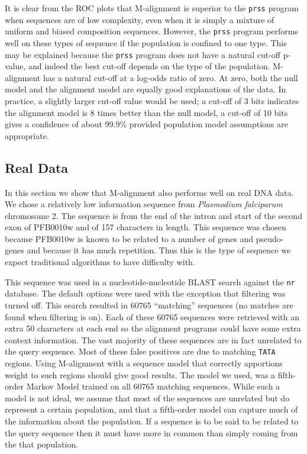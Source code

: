 \documentclass[letterpaper,11pt,oneside]{article}
\begin{document}
\begin{multicols}{2}
It is clear from the ROC plots that M-alignment is superior to
the \verb!prss! program when sequences are of low complexity, even when it is
simply a mixture of uniform and biased composition sequences.  However, the
\verb!prss! program performs well on these types of sequence if the population
is confined to one type.  This may be explained because the \verb!prss!
program does not have a natural cut-off p-value, and indeed the best cut-off
depends on the type of the population.  M-alignment has a natural cut-off at a
log-odds ratio of zero.  At zero, both the null model and the alignment model
are equally good explanations of the data.  In practice, a slightly larger
cut-off value would be used; a cut-off of 3 bits indicates the alignment model
is 8 times better than the null model, a cut-off of 10 bits gives a confidence
of about 99.9\% provided population model assumptions are appropriate.


\subsection{Real Data}

In this section we show that M-alignment also performs well on real DNA data.
We chose a relatively low information sequence from \emph{Plasmodium
falciparum} chromosome 2.  The sequence is from the end of the intron and
start of the second exon of PFB0010w and of 157 characters in length.  This
sequence was chosen because PFB0010w is known to be related to a number of
genes and pseudo-genes and because it has much repetition.  Thus this is the
type of sequence we expect traditional algorithms to have difficulty with.


This sequence was used in a nucleotide-nucleotide BLAST search against the
\verb!nr! database.  The default options were used with the exception that
filtering was turned off.  This search resulted in 60765 ``matching''
sequences (no matches are found when filtering is on).  Each of these 60765
sequences were retrieved with an extra 50 characters at each end so the
alignment programs could have some extra context information.  The vast
majority of these sequences are in fact unrelated to the query sequence.  Most
of these false positives are due to matching \verb!TATA! regions.  Using
M-alignment with a sequence model that correctly apportions weight to such
regions should give good results.  The model we used, was a fifth-order Markov
Model trained on all 60765 matching sequences.  While such a model is not
ideal, we assume that most of the sequences are unrelated but do represent a
certain population, and that a fifth-order model can capture much of the
information about the population.  If a sequence is to be said to be related
to the query sequence then it must have more in common than simply coming from
the that population.


\end{multicols}
\end{document}
